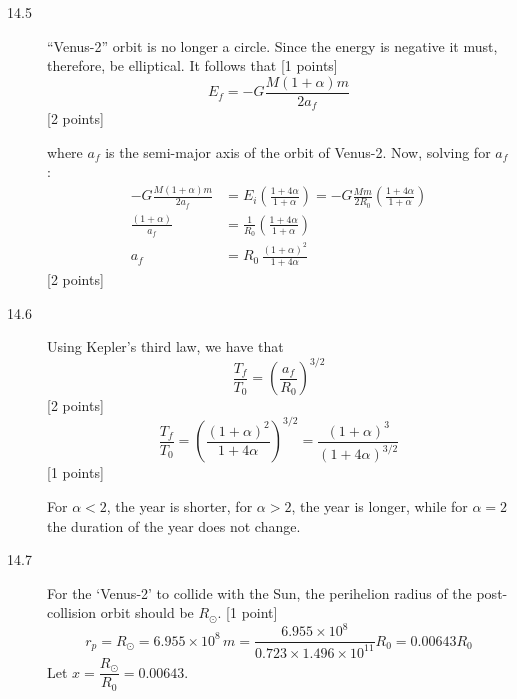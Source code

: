\begin{description}
\item[14.5] ``Venus-2'' orbit is no longer a circle. Since the energy is
  negative it must, therefore, be elliptical. It follows that
  \hfill[1 points] %
  \[
    E_f = -G\frac{M(1 + \alpha)m}{2a_f}
  \]
  \hfill[2 points]

  where $a_f$ is the semi-major axis of the orbit of Venus-2. Now, solving for
  $a_f$:
  \begin{align*}
    -G\frac{M(1 + \alpha)m}{2a_f}
      &= E_i\left(\frac{1 + 4\alpha}{1 + \alpha}\right)
       = -G\frac{Mm}{2R_0}\left(\frac{1 + 4\alpha}{1 + \alpha}\right) \\
    \frac{(1 + \alpha)}{a_f}
      &= \frac{1}{R_0}\left(\frac{1 + 4\alpha}{1 + \alpha}\right) \\
    a_f &= R_0\,\frac{(1 + \alpha)^2}{1 + 4\alpha}
  \end{align*}
  \hfill[2 points]

\item[14.6] Using Kepler's third law, we have that
  \[
    \frac{T_f}{T_0} = \left(\frac{a_f}{R_0}\right)^{3/2}
  \]
  \hfill[2 points]
  \[
    \frac{T_f}{T_0}
      = \left(\frac{(1 + \alpha)^2}{1 + 4\alpha}\right)^{3/2}
      = \frac{(1 + \alpha)^3}{(1 + 4\alpha)^{3/2}}
  \]
  \hfill[1 points] %

  For $\alpha < 2$, the year is shorter, for $\alpha > 2$, the year is longer,
  while for $\alpha = 2$ the duration of the year does not change.

\item[14.7] For the `Venus-2' to collide with the Sun, the perihelion radius
  of the post-collision orbit should be $R_\odot$. \hfill[1 point]
  \[
    r_p = R_\odot = 6.955\times10^{8}\,m
      = \frac{6.955\times10^{8}}{0.723\times1.496\times10^{11}}R_0
      = 0.00643R_0
  \]
  Let $x = \dfrac{R_\odot}{R_0} = 0.00643$.


\end{description}
